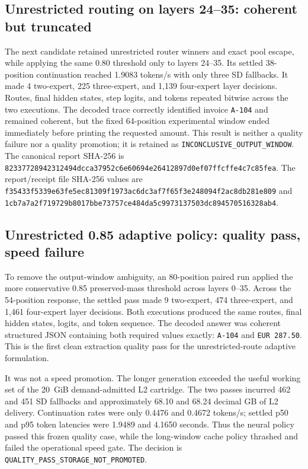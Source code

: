 \subsection{Unrestricted routing on layers 24--35: coherent but truncated}

The next candidate retained unrestricted router winners and exact pool escape,
while applying the same 0.80 threshold only to layers 24--35.  Its settled
38-position continuation reached 1.9083 tokens/s with only three SD fallbacks.
It made 4 two-expert, 225 three-expert, and 1,139 four-expert layer decisions.
Routes, final hidden states, step logits, and tokens repeated bitwise across the
two executions.  The decoded trace correctly identified invoice
\texttt{A-104} and remained coherent, but the fixed 64-position experimental
window ended immediately before printing the requested amount.  This result is
neither a quality failure nor a quality promotion; it is retained as
\texttt{INCONCLUSIVE\_OUTPUT\_WINDOW}.  The canonical report SHA-256 is
\texttt{82337728942312494dcca37952c6e60694e26412897d0ef07ffcffe4c7c85fea}.
The report/receipt file SHA-256 values are
\texttt{f35433f5339e63fe5ec81309f1973ac6dc3af7f65f3e248094f2ac8db281e809}
and
\texttt{1cb7a7a2f719729b8017bbe73757ce484da5c9973137503dc894570516328ab4}.

\subsection{Unrestricted 0.85 adaptive policy: quality pass, speed failure}

To remove the output-window ambiguity, an 80-position paired run applied the
more conservative 0.85 preserved-mass threshold across layers 0--35.  Across
the 54-position response, the settled pass made 9 two-expert, 474 three-expert,
and 1,461 four-expert layer decisions.  Both executions produced the same
routes, final hidden states, logits, and token sequence.  The decoded answer was
coherent structured JSON containing both required values exactly:
\texttt{A-104} and \texttt{EUR 287.50}.  This is the first clean extraction
quality pass for the unrestricted-route adaptive formulation.

It was not a speed promotion.  The longer generation exceeded the useful
working set of the 20~GiB demand-admitted L2 cartridge.  The two passes incurred
462 and 451 SD fallbacks and approximately 68.10 and 68.24 decimal GB of L2
delivery.  Continuation rates were only 0.4476 and 0.4672 tokens/s; settled p50
and p95 token latencies were 1.9489 and 4.1650 seconds.  Thus the neural policy
passed this frozen quality case, while the long-window cache policy thrashed and
failed the operational speed gate.  The decision is
\texttt{QUALITY\_PASS\_STORAGE\_NOT\_PROMOTED}.

